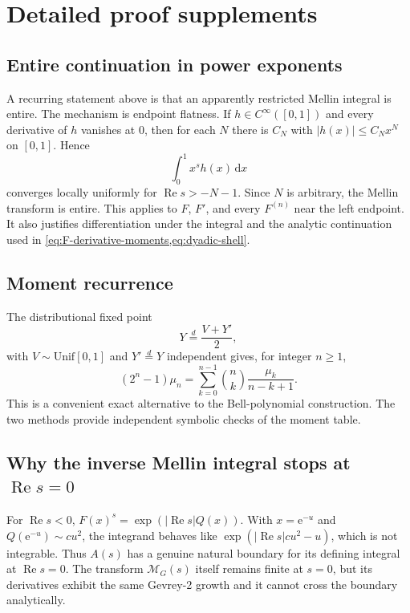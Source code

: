 \documentclass[11pt]{article}
\theoremstyle{definition}
\theoremstyle{remark}
\newcommand{\dd}{\,\mathrm d}
\newcommand{\e}{\mathrm e}
\newcommand{\Ree}{\operatorname{Re}}
\newcommand{\Mellin}{\mathcal M}
\begin{document}
\appendix
\section{Detailed proof supplements}
\label{app:proofs}

\subsection{Entire continuation in power exponents}

A recurring statement above is that an apparently restricted Mellin integral is entire.  The
mechanism is endpoint flatness.  If $h\in C^\infty([0,1])$ and every derivative of $h$ vanishes
at $0$, then for each $N$ there is $C_N$ with $|h(x)|\le C_Nx^N$ on $[0,1]$.  Hence
\[
 \int_0^1x^sh(x)\dd x
\]
converges locally uniformly for $\Ree s>-N-1$.  Since $N$ is arbitrary, the Mellin transform
is entire.  This applies to $F$, $F'$, and every $F^{(n)}$ near the left endpoint.  It also
justifies differentiation under the integral and the analytic continuation used in
\cref{eq:F-derivative-moments,eq:dyadic-shell}.

\subsection{Moment recurrence}

The distributional fixed point
\begin{equation}
 Y\overset d=\frac{V+Y'}2,
 \label{eq:Y-fixed-point}
\end{equation}
with $V\sim\mathrm{Unif}[0,1]$ and $Y'\overset d=Y$ independent gives, for integer $n\ge1$,
\begin{equation}
 (2^n-1)\mu_n
 =\sum_{k=0}^{n-1}\binom nk\frac{\mu_k}{n-k+1}.
 \label{eq:moment-recurrence}
\end{equation}
This is a convenient exact alternative to the Bell-polynomial construction.  The two methods
provide independent symbolic checks of the moment table.

\subsection{Why the inverse Mellin integral stops at $\Ree s=0$}

For $\Ree s<0$, $F(x)^s=\exp(|\Ree s|Q(x))$.  With $x=\e^{-u}$ and
$Q(\e^{-u})\sim cu^2$, the integrand behaves like
$\exp(|\Ree s|cu^2-u)$, which is not integrable.  Thus $A(s)$ has a genuine natural boundary
for its defining integral at $\Ree s=0$.  The transform $\Mellin_G(s)$ itself remains finite at
$s=0$, but its derivatives exhibit the same Gevrey-2 growth and it cannot cross the boundary
analytically.
\end{document}

